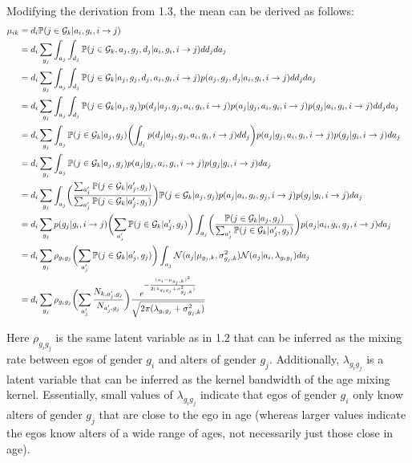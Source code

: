 \documentclass[12pt]{article}
\begin{document}
\noindent Modifying the derivation from 1.3, the mean can be derived as follows:
\begin{align}
\mu_{ik} 
&= d_i \mathbb{P}( j \in \mathcal{G}_k | a_i, g_i, i \to j) && \\\nonumber
&= d_i \sum_{g_j} \int_{a_j} \int_{d_j} \mathbb{P}( j \in \mathcal{G}_k, a_j, g_j, d_j | a_i, g_i, i \to j) dd_j da_j && \\\nonumber
&= d_i \sum_{g_j} \int_{a_j} \int_{d_j} \mathbb{P}( j \in \mathcal{G}_k | a_j, g_j, d_j, a_i, g_i, i \to j) p(a_j, g_j, d_j | a_i, g_i, i \to j) dd_j da_j && \\\nonumber
&= d_i \sum_{g_j} \int_{a_j} \int_{d_j} \mathbb{P}( j \in \mathcal{G}_k | a_j, g_j) p(d_j | a_j, g_j, a_i, g_i, i \to j) 
p(a_j | g_j, a_i, g_i, i \to j) p(g_j | a_i, g_i, i \to j) dd_j da_j && \\\nonumber
&= d_i \sum_{g_j} \int_{a_j}  \mathbb{P}( j \in \mathcal{G}_k | a_j, g_j) \biggl( \int_{d_j}  p(d_j | a_j, g_j, a_i, g_i, i \to j) dd_j \biggr)
p(a_j | g_j, a_i, g_i, i \to j) p(g_j | g_i, i \to j) da_j && \\\nonumber
&= d_i \sum_{g_j} \int_{a_j}  \mathbb{P}( j \in \mathcal{G}_k | a_j, g_j) 
p(a_j | g_j, a_i, g_i, i \to j) p(g_j | g_i, i \to j) da_j && \\\nonumber
&= d_i \sum_{g_j} \int_{a_j} 
\biggl( \frac{ \sum_{a_j'} \mathbb{P}( j \in \mathcal{G}_k | a_j', g_j) }{ \sum_{a_j'} \mathbb{P}( j \in \mathcal{G}_k | a_j', g_j) } \biggr) 
\mathbb{P}( j \in \mathcal{G}_k | a_j, g_j) p(a_j | a_i, g_i, g_j, i \to j) p(g_j | g_i, i \to j) da_j && \\\nonumber
&= d_i \sum_{g_j} p(g_j | g_i, i \to j) 
\biggl( \sum_{a_j'} \mathbb{P}( j \in \mathcal{G}_k | a_j', g_j) \biggr) 
\int_{a_j} \biggl( \frac{ \mathbb{P}( j \in \mathcal{G}_k | a_j, g_j) }{ \sum_{a_j'} \mathbb{P}( j \in \mathcal{G}_k | a_j', g_j) } \biggr)
p(a_j | a_i, g_i, g_j, i \to j) da_j && \\\nonumber
&= d_i \sum_{g_j} \rho_{g_ig_j} 
\biggl( \sum_{a_j'} \mathbb{P}( j \in \mathcal{G}_k | a_j', g_j) \biggr) 
\int_{a_j} \mathcal{N}(a_j | \mu_{g_j,k}, \sigma_{g_j,k}^2)
\mathcal{N}(a_j | a_i, \lambda_{g_ig_j}) da_j && \\\nonumber
&= d_i \sum_{g_j} \rho_{g_ig_j} 
\biggl( \sum_{a_j'} \frac{ N_{k, a_j', g_j} }{ N_{a_j', g_j} } \biggr) 
\frac{ e^{ -\frac{ (a_i - \mu_{g_j,k})^2 }{ 2(\lambda_{g_ig_j} + \sigma_{g_j,k}^2) } } }{ \sqrt{ 2\pi(\lambda_{g_ig_j} + \sigma_{g_j,k}^2) } }
\end{align}

\noindent Here $\rho_{g_ig_j}$ is the same latent variable as in 1.2 that can be inferred as the mixing rate between egos of gender $g_i$ and alters of gender $g_j$. Additionally, $\lambda_{g_ig_j}$ is a latent variable that can be inferred as the kernel bandwidth of the age mixing kernel. Essentially, small values of $\lambda_{g_ig_j}$ indicate that egos of gender $g_i$ only know alters of gender $g_j$ that are close to the ego in age (whereas larger values indicate the egos know alters of a wide range of ages, not necessarily just those close in age).\\
\end{document}

